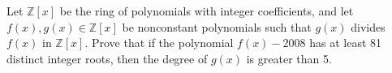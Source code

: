 Let \( \mathbb{Z}[x]\) be the ring of polynomials with integer coefficients, and let \( f(x), g(x) \in\mathbb{Z}[x]\) be nonconstant polynomials such that \( g(x)\) divides \( f(x)\) in \( \mathbb{Z}[x]\). Prove that if the polynomial \( f(x)-2008\) has at least 81 distinct integer roots, then the degree of \( g(x)\) is greater than 5.